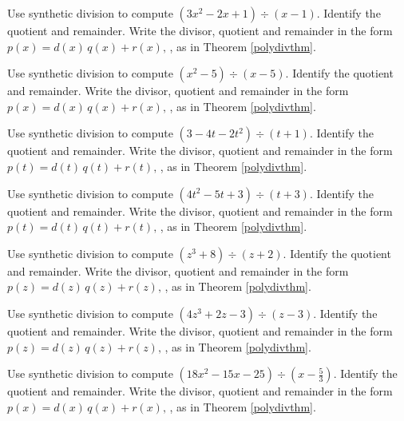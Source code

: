 \documentclass{ximera}
\begin{document}
	\author{Stitz-Zeager}

\begin{problem}\label{synthdivreviewfirst}
Use synthetic division to compute $\left(3x^2-2x+1 \right) \div \left(x-1\right)$.  Identify the quotient and remainder. Write the divisor, quotient and remainder in the form $p(x) = d(x) \, q(x) + r(x),\,$, as in Theorem \ref{polydivthm}.
\end{problem}

\begin{problem}
Use synthetic division to compute $\left(x^2-5 \right) \div \left(x-5\right)$.  Identify the quotient and remainder. Write the divisor, quotient and remainder in the form $p(x) = d(x) \, q(x) + r(x),\,$, as in Theorem \ref{polydivthm}.
\end{problem}

\begin{problem}
Use synthetic division to compute $\left(3-4t-2t^2 \right) \div \left(t+1\right)$.  Identify the quotient and remainder. Write the divisor, quotient and remainder in the form $p(t) = d(t) \, q(t) + r(t),\,$, as in Theorem \ref{polydivthm}.
\end{problem}

\begin{problem}
Use synthetic division to compute $\left(4t^2-5t +3\right) \div \left(t+3\right)$.  Identify the quotient and remainder. Write the divisor, quotient and remainder in the form $p(t) = d(t) \, q(t) + r(t),\,$, as in Theorem \ref{polydivthm}.
\end{problem}

\begin{problem}
Use synthetic division to compute $\left(z^3 + 8 \right) \div \left(z+2\right)$.  Identify the quotient and remainder. Write the divisor, quotient and remainder in the form $p(z) = d(z) \, q(z) + r(z),\,$, as in Theorem \ref{polydivthm}.
\end{problem}

\begin{problem}
Use synthetic division to compute $\left(4z^3 +2z-3 \right) \div \left(z -3\right)$.  Identify the quotient and remainder. Write the divisor, quotient and remainder in the form $p(z) = d(z) \, q(z) + r(z),\,$, as in Theorem \ref{polydivthm}.
\end{problem}

\begin{problem}
Use synthetic division to compute $\left(18x^2-15x-25\right) \div \left(x - \frac{5}{3} \right)$.  Identify the quotient and remainder. Write the divisor, quotient and remainder in the form $p(x) = d(x) \, q(x) + r(x),\,$, as in Theorem \ref{polydivthm}.
\end{problem}
\end{document}
